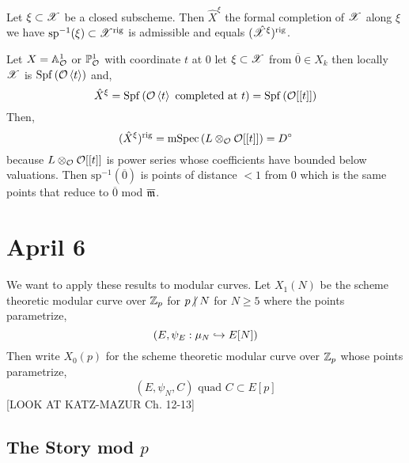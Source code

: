 \documentclass[12pt]{article}
\begin{document}
\begin{prop}[Berthelot]
Let $\xi \subset \mathscr{X}$ be a closed subscheme. Then $\hat{X}^\xi$ the formal completion of $\mathscr{X}$ along $\xi$ we have $\mathrm{sp}^{-1}(\xi) \subset \mathscr{X}^{\mathrm{rig}}$ is admissible and equals $(\hat{\mathscr{X}}^\xi)^{\mathrm{rig}}$. 
\end{prop}

\begin{example}
Let $X = \mathbb{A}^1_{\mathcal{O}}$  or $\mathbb{P}^1_{\mathcal{O}}$ with coordinate $t$ at $0$ let $\xi \subset \mathscr{X}$ from $\overline{0} \in X_k$ then locally $\mathscr{X}$ is $\mathrm{Spf}\left( \mathcal{O}\left< t \right> \right)$ and,
\[ \hat{X}^\xi = \mathrm{Spf}\left( \mathcal{O}\left< t \right> \text{ completed at } t \right) = \mathrm{Spf}\left( \mathcal{O}[[t]] \right) \]
Then,
\[ (\hat{X}^\xi)^{\mathrm{rig}} = \mathrm{mSpec}\left( L \otimes_{\mathcal{O}} \mathcal{O}[[t]] \right) = D^\circ \]
because $L \otimes_{\mathcal{O}} \mathcal{O}[[t]]$ is power series whose coefficients have bounded below valuations. Then $\mathrm{sp}^{-1}(\overline{0})$ is points of distance $<1$ from $0$ which is the same points that reduce to $\overline{0}$ mod $\overline{\mathfrak{m}}$. 
\end{example}

\section{April 6}

We want to apply these results to modular curves. Let $X_1(N)$ be the scheme theoretic modular curve over $\mathbb{Z}_p$ for $p \ndivides N$ for $N \ge 5$ where the points parametrize,
\[ (E, \psi_E : \mu_N \hookrightarrow E[N]) \]
Then write $X_0(p)$ for the scheme theoretic modular curve over $\mathbb{Z}_p$ whose points parametrize,
\[ (E, \psi_N, C) \text{ quad } C \subset E[p] \]
[LOOK AT KATZ-MAZUR Ch. 12-13]  

\subsection{The Story mod $p$}
\end{document}
